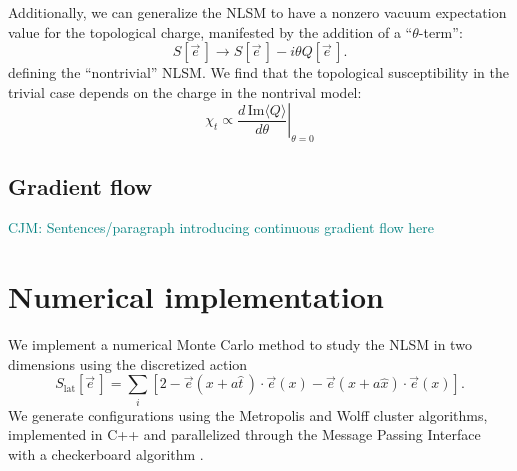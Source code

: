 \documentclass[a4paper,11pt]{article}
\newcommand{\e}{\vec e}
\newcommand\chris[1]{\textcolor{teal}{CJM: #1}}
\begin{document}
Additionally, we can generalize the NLSM to have a nonzero vacuum expectation value for the topological charge, manifested by the addition of a ``$\theta$-term'':
\begin{equation*}
    S[\e\,] \rightarrow S[\e\,] - i \theta Q[\e\,].
\end{equation*}
defining the ``nontrivial'' NLSM. We find that the topological susceptibility in the trivial case depends on the charge in the nontrival model:
\begin{equation}
    \chi_t \propto \left. \frac{d\,\mathrm{Im}\langle Q \rangle}{d\theta}\right|_{\theta=0}
\end{equation}



\subsection{Gradient flow}

\chris{Sentences/paragraph introducing continuous gradient flow here}

\section{Numerical implementation}
We implement a numerical Monte Carlo method to study the NLSM in two dimensions using the discretized action
\begin{equation}
    \label{eq:nlsm discretized action}
    S_\mathrm{lat}[\e\,] = \sum_i \left[ 2 - \e(x+a\hat{t}\,)\cdot\e(x) - \e(x+a\hat{x})\cdot\e(x) \right].
\end{equation}
We generate configurations using the Metropolis \cite{} and Wolff cluster \cite{wolff1989} algorithms, implemented in C++ and parallelized through the Message Passing Interface with a checkerboard algorithm \cite{}. 
\end{document}
